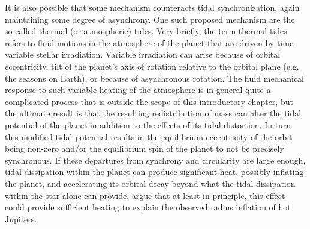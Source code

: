 It is also possible that some mechanism counteracts tidal synchronization, again
maintaining some degree of asynchrony.  One such proposed mechanism are the
so-called thermal (or atmospheric) tides.  Very briefly, the term thermal tides
refers to fluid motions in the atmosphere of the planet that are driven by
time-variable stellar irradiation. Variable irradiation can arise because of
orbital eccentricity, tilt of the planet's axis of rotation relative to the
orbital plane (e.g. the seasons on Earth), or because of asynchronous rotation.
The fluid mechanical response to such variable heating of the atmosphere is in
general quite a complicated process that is outside the scope of this
introductory chapter, but the ultimate result is that the resulting
redistribution of mass can alter the tidal potential of the planet in addition
to the effects of its tidal distortion. In turn this modified tidal potential
results in the equilibrium eccentricity of the orbit being non-zero and/or the
equilibrium spin of the planet to not be precisely synchronous. If these
departures from synchrony and circularity are large enough, tidal dissipation
within the planet can produce significant heat, possibly inflating the planet,
and accelerating its orbital decay beyond what the tidal dissipation within the
star alone can provide. \citet{Arras_Socrates_10} argue that at least in
principle, this effect could provide sufficient heating to explain the observed
radius inflation of hot Jupiters.
